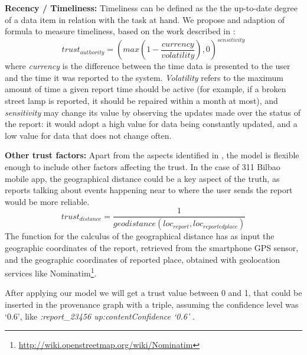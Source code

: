 \textbf{Recency / Timeliness:} Timeliness can be defined as the the up-to-date degree of a data item in relation with the task at hand. We propose and adaption of \cite{Hartig09usingweb} formula to measure timeliness, based on the work described in \cite{Ballou:1998:MIM:291329.291335}:
%
\begin{equation}
    trust_{authority} = (max(1-\frac{currency}{volatility}), 0)^{sensitivity}
\end{equation}
%
where \emph{currency} is the difference between the time data is presented to the user and the time it was reported to the system. \emph{Volatility} refers to the maximum amount of time a given report time should be active (for example, if a broken street lamp is reported, it should be repaired within a month at most), and \emph{sensitivity} may change its value by observing the updates made over the status of the report: it would adopt a high value for data being constantly updated, and a low value for data that does not change often.

\textbf{Other trust factors:} Apart from the aspects identified in \cite{gil2007towards}, the model is flexible enough to include other factors affecting the trust. In the case of 311 Bilbao mobile app, the geographical distance could be a key aspect of the truth, as reports talking about events happening near to where the user sends the report would be more reliable.
%
\begin{equation}
trust_{distance} = \frac{1}{geodistance(loc_{report}, loc_{reportedplace})}
\end{equation}
%
The function for the calculus of the geographical distance has as input the geographic coordinates of the report, retrieved from the smartphone GPS sensor, and the geographic coordinates of reported place, obtained with geolocation services like Nominatim\footnote{\url{http://wiki.openstreetmap.org/wiki/Nominatim}}.

After applying our model we will get a trust value between 0 and 1, that could be inserted in the provenance graph with a triple, assuming the confidence level was `0.6', like \textit{:report\_23456 up:contentConfidence `0.6'} \cite{de_nies_modeling_2013}.
